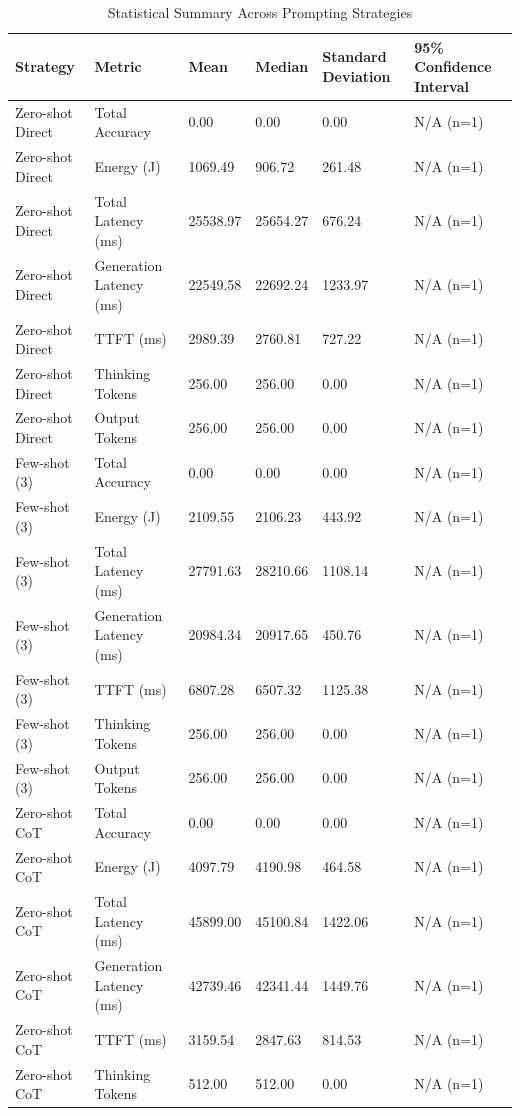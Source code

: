 \begin{table}
\caption{Statistical Summary Across Prompting Strategies}
\label{tab:statistical_summary}
\begin{tabular}{llllll}
\toprule
Strategy & Metric & Mean & Median & Standard Deviation & 95\% Confidence Interval \\
\midrule
Zero-shot Direct & Total Accuracy & 0.00 & 0.00 & 0.00 & N/A (n=1) \\
Zero-shot Direct & Energy (J) & 1069.49 & 906.72 & 261.48 & N/A (n=1) \\
Zero-shot Direct & Total Latency (ms) & 25538.97 & 25654.27 & 676.24 & N/A (n=1) \\
Zero-shot Direct & Generation Latency (ms) & 22549.58 & 22692.24 & 1233.97 & N/A (n=1) \\
Zero-shot Direct & TTFT (ms) & 2989.39 & 2760.81 & 727.22 & N/A (n=1) \\
Zero-shot Direct & Thinking Tokens & 256.00 & 256.00 & 0.00 & N/A (n=1) \\
Zero-shot Direct & Output Tokens & 256.00 & 256.00 & 0.00 & N/A (n=1) \\
Few-shot (3) & Total Accuracy & 0.00 & 0.00 & 0.00 & N/A (n=1) \\
Few-shot (3) & Energy (J) & 2109.55 & 2106.23 & 443.92 & N/A (n=1) \\
Few-shot (3) & Total Latency (ms) & 27791.63 & 28210.66 & 1108.14 & N/A (n=1) \\
Few-shot (3) & Generation Latency (ms) & 20984.34 & 20917.65 & 450.76 & N/A (n=1) \\
Few-shot (3) & TTFT (ms) & 6807.28 & 6507.32 & 1125.38 & N/A (n=1) \\
Few-shot (3) & Thinking Tokens & 256.00 & 256.00 & 0.00 & N/A (n=1) \\
Few-shot (3) & Output Tokens & 256.00 & 256.00 & 0.00 & N/A (n=1) \\
Zero-shot CoT & Total Accuracy & 0.00 & 0.00 & 0.00 & N/A (n=1) \\
Zero-shot CoT & Energy (J) & 4097.79 & 4190.98 & 464.58 & N/A (n=1) \\
Zero-shot CoT & Total Latency (ms) & 45899.00 & 45100.84 & 1422.06 & N/A (n=1) \\
Zero-shot CoT & Generation Latency (ms) & 42739.46 & 42341.44 & 1449.76 & N/A (n=1) \\
Zero-shot CoT & TTFT (ms) & 3159.54 & 2847.63 & 814.53 & N/A (n=1) \\
Zero-shot CoT & Thinking Tokens & 512.00 & 512.00 & 0.00 & N/A (n=1) \\

\end{tabular}
\end{table}
